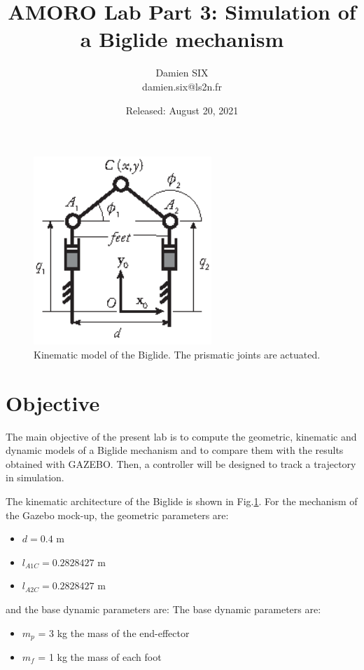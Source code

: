 \documentclass[a4paper]{article}
\title{AMORO Lab Part 3: Simulation of a Biglide mechanism}
\author{Damien SIX\\ damien.six@ls2n.fr}
\date{Released: August 20, 2021}
\begin{document}
\maketitle
\begin{figure}[h!]
\centering
\includegraphics[width=0.6\textwidth]{PuRRRPu.eps}
\caption{Kinematic model of the Biglide. The prismatic joints are actuated.}
\label{fig:biglide}
\end{figure}
\section{Objective}
The main objective of the present lab is to compute the geometric, kinematic and dynamic models of a Biglide mechanism and to compare them with the results obtained with GAZEBO. Then, a controller will be designed to track a trajectory in simulation.

The kinematic architecture of the Biglide is shown in Fig.\ref{fig:biglide}. For the mechanism of the Gazebo mock-up, the geometric parameters are: 
\begin{itemize}
\item    $d=0.4$ m
\item    $l_{A1C}=0.2828427$ m
\item    $l_{A2C}=0.2828427$ m
\end{itemize}
and the base dynamic parameters are:
The base dynamic parameters are: 
\begin{itemize}
\item $m_p$ = 3 kg the mass of the end-effector
\item $m_f$ = 1 kg the mass of each foot
\end{itemize} 
\end{document}
